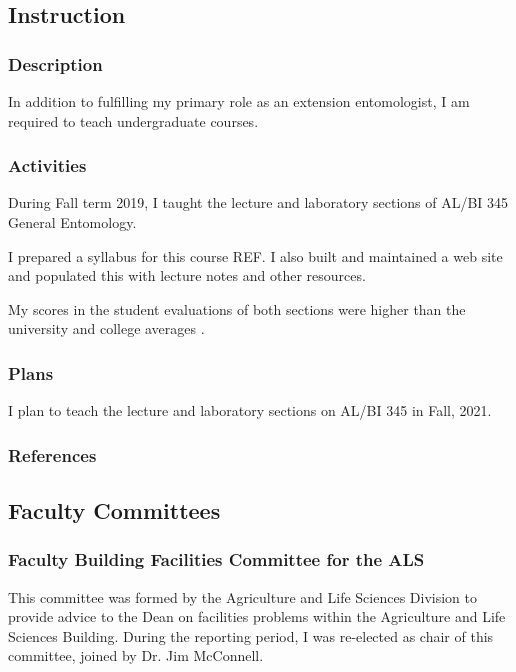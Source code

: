 \subsection{Instruction}
\begin{refsection}
	
\subsubsection{Description}

In addition to fulfilling my primary role as an extension entomologist, I am required to teach undergraduate courses.

\subsubsection{Activities}

During Fall term 2019, I taught the lecture and laboratory sections of AL/BI 345 General Entomology.

I prepared a syllabus for this course REF. I also built and maintained a web site \cite{moore_web_2019-1} and populated this with lecture notes and other resources.

My scores in the student evaluations of both sections were higher than the university and college averages \cite{moore_student_2019}.

\subsubsection{Plans}

I plan to teach the lecture and laboratory sections on AL/BI 345 in Fall, 2021.

\subsubsection{References}
\printbibliography[heading=none]
\end{refsection}

\subsection{Faculty Committees}

\subsubsection{Faculty Building Facilities Committee for the ALS}

This committee was formed by the Agriculture and Life Sciences Division
to provide advice to the Dean on facilities problems within the Agriculture
and Life Sciences Building. During the reporting period, I was re-elected
as chair of this committee, joined by Dr. Jim McConnell.

